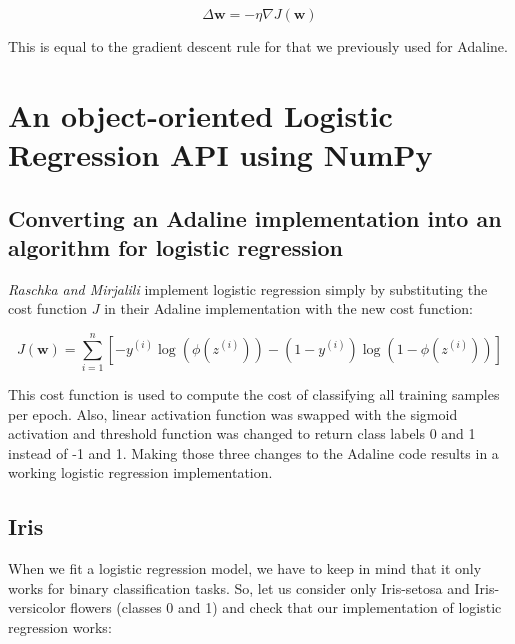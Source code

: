 \documentclass[11pt]{article}
\newcommand{\vect}[1]{\boldsymbol{#1}}
\begin{document}
    \begin{equation}
        \Delta \vect{w}
        = - \eta \nabla J( \vect{w} )
    \end{equation}

    This is equal to the gradient descent rule for that we previously used for Adaline.

    \section{An object-oriented Logistic Regression API using NumPy} \label{sec:lr_api}

    \subsection{Converting an Adaline implementation into an algorithm for logistic regression} \label{subsec:ada_to_lr}

    \textit{Raschka and Mirjalili} implement logistic regression simply by substituting the cost function $J$ in their Adaline implementation with the new cost function:

    \begin{equation}
        \label{eq:lr_cost}
        J( \vect{w} ) =
        \sum \limits_{i=1}^n \left[ - y^{(i)} \log \left( \phi \left( z^{(i)} \right) \right) - \left( 1 - y^{(i)} \right) \log \left( 1 - \phi \left( z^{(i)} \right) \right) \right]
    \end{equation}

    This cost function is used to compute the cost of classifying all training samples per epoch.
    Also, linear activation function was swapped with the sigmoid activation and threshold function was changed to return class labels 0 and 1 instead of -1 and 1.
    Making those three changes to the Adaline code results in a working logistic regression implementation.

    \subsection{Iris}
    When we fit a logistic regression model, we have to keep in mind that it only works for binary classification tasks.
    So, let us consider only Iris-setosa and Iris-versicolor flowers (classes 0 and 1) and check that our implementation of logistic regression works:

    \medskip
    
    
\end{document}
